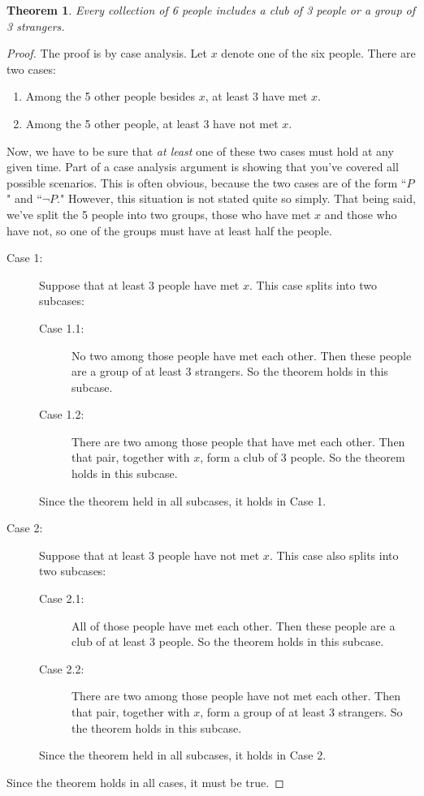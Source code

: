 \documentclass[11pt,oneside]{book}
\newtheorem{thm}{Theorem}[section]
\theoremstyle{definition}
\begin{document}
\begin{thm}
    Every collection of 6 people includes a club of 3 people or a group of 3 strangers.
\end{thm}
\begin{proof}
The proof is by case analysis.
Let $x$ denote one of the six people.
There are two cases:
\begin{enumerate}
    \item Among the 5 other people besides $x$, at least 3 have met $x$.

    \item Among the 5 other people, at least 3 have not met $x$.
\end{enumerate}
Now, we have to be sure that \emph{at least} one of these two cases must hold at any given time.
Part of a case analysis argument is showing that you've covered all possible scenarios.
This is often obvious, because the two cases are of the form ``$P$" and ``$\lnot P$."
However, this situation is not stated quite so simply.
That being said, we've split the 5 people into two groups, those who have met $x$ and those who have not, so one of the groups must have at least half the people.
\begin{description}
\item[Case 1:] Suppose that at least 3 people have met $x$.
    This case splits into two subcases:
    \begin{description}
        \item[Case 1.1:] No two among those people have met each other.
        Then these people are a group of at least 3 strangers.
        So the theorem holds in this subcase.

        \item[Case 1.2:] There are two among those people that have met each other.
        Then that pair, together with $x$, form a club of 3 people.
        So the theorem holds in this subcase.
    \end{description}
    Since the theorem held in all subcases, it holds in Case 1.

    \item[Case 2:] Suppose that at least 3 people have not met $x$.
    This case also splits into two subcases:
    \begin{description}
        \item[Case 2.1:] All of those people have met each other.
        Then these people are a club of at least 3 people.
        So the theorem holds in this subcase.

        \item[Case 2.2:] There are two among those people have not met each other.
        Then that pair, together with $x$, form a group of at least 3 strangers.
        So the theorem holds in this subcase.
    \end{description}
    Since the theorem held in all subcases, it holds in Case 2.
\end{description}
Since the theorem holds in all cases, it must be true.
\end{proof}
\end{document}
